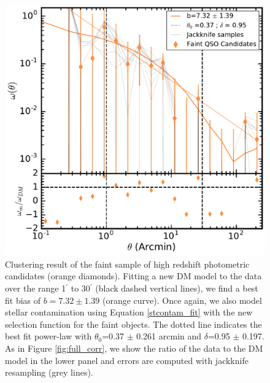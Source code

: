 \documentclass[apj, numberedappendix]{emulateapj}
\begin{document}
\begin{figure}[h!]
\centering
\includegraphics[scale = 0.35]{./New_Plots/SpIES_corrfunc_faint.pdf}
\caption{\footnotesize{Clustering result of the faint sample of high redshift photometric candidates (orange diamonds). Fitting a new DM model to the data over the range 1$^{\prime}$ to 30$^{\prime}$ (black dashed vertical lines), we find a best fit bias of $b = 7.32 \pm 1.39$ (orange curve). Once again, we also model stellar contamination using Equation \ref{stcontam_fit} with the new selection function for the faint objects. The dotted line indicates the best fit power-law with $\theta_0$=0.37 $\pm$ 0.261 arcmin and $\delta$=0.95 $\pm$ 0.197. As in Figure \ref{fig:full_corr}, we show the ratio of the data to the DM model in the lower panel and errors are computed with jackknife resampling (grey lines).}}
\label{fig:faint_corr}
\end{figure}

\end{document}
